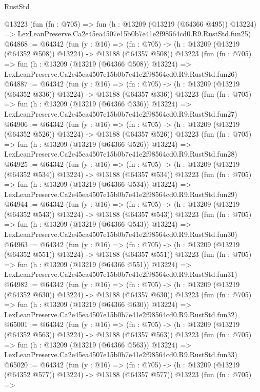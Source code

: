 \begin{lexlean}{RustStd}
\begin{coremodule}
    @13223
    (fun (fn : @705) =>
    fun (h : @13209 (@13219 (@64366 @495)) @13224) =>
    LexLeanPreserve.Ca2e45ea4507e15b0b7e41e2f98564cd0.R9.RustStd.fun25)
@64868 := @64342
    (fun (y : @16) =>
    (fn : @705) -> (h : @13209 (@13219 (@64352 @508)) @13224) -> @13188 (@64357 @508))
    @13223
    (fun (fn : @705) =>
    fun (h : @13209 (@13219 (@64366 @508)) @13224) =>
    LexLeanPreserve.Ca2e45ea4507e15b0b7e41e2f98564cd0.R9.RustStd.fun26)
@64887 := @64342
    (fun (y : @16) =>
    (fn : @705) -> (h : @13209 (@13219 (@64352 @336)) @13224) -> @13188 (@64357 @336))
    @13223
    (fun (fn : @705) =>
    fun (h : @13209 (@13219 (@64366 @336)) @13224) =>
    LexLeanPreserve.Ca2e45ea4507e15b0b7e41e2f98564cd0.R9.RustStd.fun27)
@64906 := @64342
    (fun (y : @16) =>
    (fn : @705) -> (h : @13209 (@13219 (@64352 @526)) @13224) -> @13188 (@64357 @526))
    @13223
    (fun (fn : @705) =>
    fun (h : @13209 (@13219 (@64366 @526)) @13224) =>
    LexLeanPreserve.Ca2e45ea4507e15b0b7e41e2f98564cd0.R9.RustStd.fun28)
@64925 := @64342
    (fun (y : @16) =>
    (fn : @705) -> (h : @13209 (@13219 (@64352 @534)) @13224) -> @13188 (@64357 @534))
    @13223
    (fun (fn : @705) =>
    fun (h : @13209 (@13219 (@64366 @534)) @13224) =>
    LexLeanPreserve.Ca2e45ea4507e15b0b7e41e2f98564cd0.R9.RustStd.fun29)
@64944 := @64342
    (fun (y : @16) =>
    (fn : @705) -> (h : @13209 (@13219 (@64352 @543)) @13224) -> @13188 (@64357 @543))
    @13223
    (fun (fn : @705) =>
    fun (h : @13209 (@13219 (@64366 @543)) @13224) =>
    LexLeanPreserve.Ca2e45ea4507e15b0b7e41e2f98564cd0.R9.RustStd.fun30)
@64963 := @64342
    (fun (y : @16) =>
    (fn : @705) -> (h : @13209 (@13219 (@64352 @551)) @13224) -> @13188 (@64357 @551))
    @13223
    (fun (fn : @705) =>
    fun (h : @13209 (@13219 (@64366 @551)) @13224) =>
    LexLeanPreserve.Ca2e45ea4507e15b0b7e41e2f98564cd0.R9.RustStd.fun31)
@64982 := @64342
    (fun (y : @16) =>
    (fn : @705) -> (h : @13209 (@13219 (@64352 @630)) @13224) -> @13188 (@64357 @630))
    @13223
    (fun (fn : @705) =>
    fun (h : @13209 (@13219 (@64366 @630)) @13224) =>
    LexLeanPreserve.Ca2e45ea4507e15b0b7e41e2f98564cd0.R9.RustStd.fun32)
@65001 := @64342
    (fun (y : @16) =>
    (fn : @705) -> (h : @13209 (@13219 (@64352 @563)) @13224) -> @13188 (@64357 @563))
    @13223
    (fun (fn : @705) =>
    fun (h : @13209 (@13219 (@64366 @563)) @13224) =>
    LexLeanPreserve.Ca2e45ea4507e15b0b7e41e2f98564cd0.R9.RustStd.fun33)
@65020 := @64342
    (fun (y : @16) =>
    (fn : @705) -> (h : @13209 (@13219 (@64352 @577)) @13224) -> @13188 (@64357 @577))
    @13223
    (fun (fn : @705) =>

\end{coremodule}
\end{lexlean}
